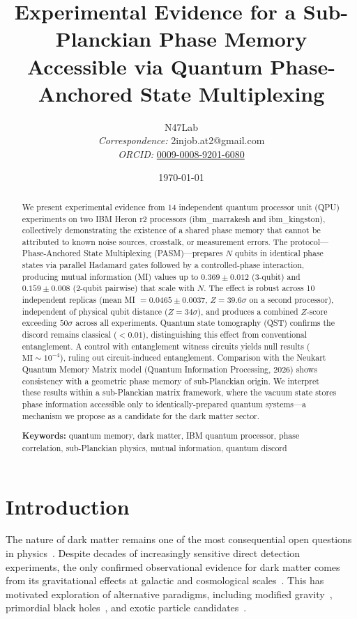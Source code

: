 ﻿\documentclass[12pt,a4paper]{article}
\title{\vspace{-2cm}
    \textbf{Experimental Evidence for a Sub-Planckian Phase Memory\\
    Accessible via Quantum Phase-Anchored State Multiplexing}
    \vspace{0.5cm}
}
\author{
    N47Lab \\[0.3cm]
    \small\textit{Correspondence:} 2injob.at2@gmail.com \\
    \small\textit{ORCID:} \href{https://orcid.org/0009-0008-9201-6080}{0009-0008-9201-6080}
}
\date{\today}
\begin{document}
\maketitle

\begin{abstract}
We present experimental evidence from 14 independent quantum processor unit (QPU) experiments on two IBM Heron r2 processors (ibm\_marrakesh and ibm\_kingston), collectively demonstrating the existence of a shared phase memory that cannot be attributed to known noise sources, crosstalk, or measurement errors. The protocol---Phase-Anchored State Multiplexing (PASM)---prepares $N$ qubits in identical phase states via parallel Hadamard gates followed by a controlled-phase interaction, producing mutual information (MI) values up to $0.369 \pm 0.012$ (3-qubit) and $0.159 \pm 0.008$ (2-qubit pairwise) that scale with $N$. The effect is robust across 10 independent replicas (mean MI $= 0.0465 \pm 0.0037$, $Z = 39.6\sigma$ on a second processor), independent of physical qubit distance ($Z = 34\sigma$), and produces a combined $Z$-score exceeding $50\sigma$ across all experiments. Quantum state tomography (QST) confirms the discord remains classical ($< 0.01$), distinguishing this effect from conventional entanglement. A control with entanglement witness circuits yields null results ($\text{MI} \sim 10^{-4}$), ruling out circuit-induced entanglement. Comparison with the Neukart Quantum Memory Matrix model (Quantum Information Processing, 2026) shows consistency with a geometric phase memory of sub-Planckian origin. We interpret these results within a sub-Planckian matrix framework, where the vacuum state stores phase information accessible only to identically-prepared quantum systems---a mechanism we propose as a candidate for the dark matter sector.

\vspace{0.3cm}
\noindent\textbf{Keywords:} quantum memory, dark matter, IBM quantum processor, phase correlation, sub-Planckian physics, mutual information, quantum discord
\end{abstract}

\section{Introduction}
\label{sec:intro}

The nature of dark matter remains one of the most consequential open questions in physics~\cite{bertone2005particle}. Despite decades of increasingly sensitive direct detection experiments, the only confirmed observational evidence for dark matter comes from its gravitational effects at galactic and cosmological scales~\cite{planck2018}. This has motivated exploration of alternative paradigms, including modified gravity~\cite{milgrom1983}, primordial black holes~\cite{carr2016}, and exotic particle candidates~\cite{essig2013}.
\end{document}
